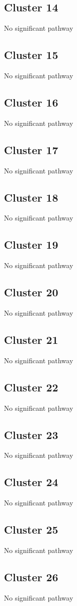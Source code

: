 \documentclass{article}
\begin{document}
\subsection{Cluster 14 }
No significant pathway
\subsection{Cluster 15 }
No significant pathway
\subsection{Cluster 16 }
No significant pathway
\subsection{Cluster 17 }
No significant pathway
\subsection{Cluster 18 }
No significant pathway
\subsection{Cluster 19 }
No significant pathway
\subsection{Cluster 20 }
No significant pathway
\subsection{Cluster 21 }
No significant pathway
\subsection{Cluster 22 }
No significant pathway
\subsection{Cluster 23 }
No significant pathway
\subsection{Cluster 24 }
No significant pathway
\subsection{Cluster 25 }
No significant pathway
\subsection{Cluster 26 }
No significant pathway
\end{document}
